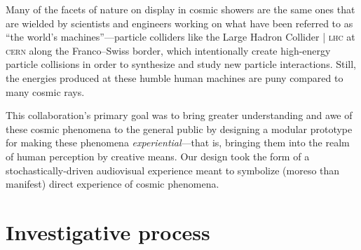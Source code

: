 \documentclass[12pt]{article}
\begin{document}
    Many of the facets of nature on display in cosmic showers are the same ones that are wielded by scientists and engineers working on what have been referred to as ``the world's machines''—particle colliders like the Large Hadron Collider | \textsc{lhc} at \textsc{cern} along the Franco–Swiss border, which intentionally create high-energy particle collisions in order to synthesize and study new particle interactions. Still, the energies produced at these humble human machines are puny compared to many cosmic rays.

    This collaboration's primary goal was to bring greater understanding and awe of these cosmic phenomena to the general public by designing a modular prototype for making these phenomena \textit{experiential}—that is, bringing them into the realm of human perception by creative means. Our design took the form of a stochastically-driven audiovisual experience meant to symbolize (moreso than manifest) direct experience of cosmic phenomena. 

    \pagebreak
    \section{Investigative process}
\end{document}
